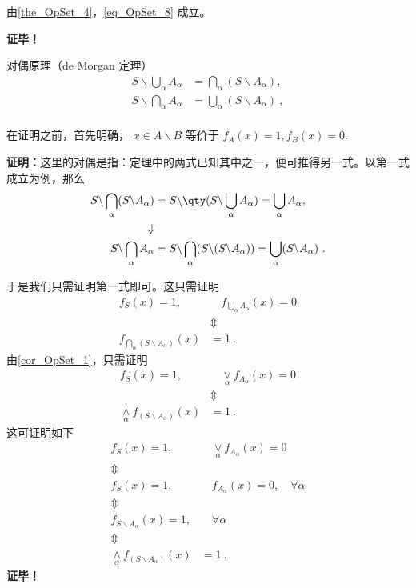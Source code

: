 由\autoref{the_OpSet_4}，\autoref{eq_OpSet_8} 成立。

\textbf{证毕！}
\begin{theorem}{对偶原理（de Morgan 定理）}
\begin{equation}
\begin{aligned}
S\backslash \bigcup_\alpha A_\alpha&=\bigcap_\alpha(S\backslash A_\alpha),\\
S\backslash \bigcap_\alpha A_\alpha&=\bigcup_\alpha(S \backslash A_\alpha)~,\\
\end{aligned}
\end{equation}
\end{theorem}

在证明之前，首先明确， $x \in A\backslash B$ 等价于 $f_A(x)=1,f_B(x)=0$.

\textbf{证明：}这里的对偶是指：定理中的两式已知其中之一，便可推得另一式。以第一式成立为例，那么
\begin{equation}
\begin{aligned}
S\backslash \bigcap_\alpha (S\backslash A_\alpha)&=S\backslash \qty(S\backslash\bigcup_\alpha A_\alpha)=\bigcup_\alpha A_\alpha,\\
\Downarrow\\
S\backslash \bigcap_\alpha A_\alpha&=S\backslash \bigcap_\alpha (S\backslash (S\backslash A_\alpha))=\bigcup_\alpha (S\backslash A_\alpha)~.
\end{aligned}
\end{equation}

于是我们只需证明第一式即可。这只需证明
\begin{equation}
\begin{aligned}
f_S(x)=1,&\quad f_{\bigcup_\alpha A_\alpha}(x)=0\\
&\Updownarrow\\
f_{\bigcap_\alpha (S\backslash A_\alpha)}(x)&=1~.
\end{aligned}
\end{equation}
由\autoref{cor_OpSet_1}，只需证明
\begin{equation}
\begin{aligned}
f_S(x)=1,&\quad \underset{\alpha}{\lor}f_{A_\alpha}(x)=0\\
&\Updownarrow\\
\underset{\alpha}{\land}f_{(S\backslash A_\alpha)}(x)&=1~.
\end{aligned}
\end{equation}
这可证明如下
\begin{equation}
\begin{aligned}
f_S(x)=1,&\quad \underset{\alpha}{\lor}f_{A_\alpha}(x)=0\\
\Updownarrow\\
f_S(x)=1,&\quad f_{A_\alpha}(x)=0,\quad\forall \alpha\\
\Updownarrow\\
f_{S\backslash A_\alpha}(x)=1,&\quad\forall \alpha\\
\Updownarrow\\
\underset{\alpha}{\land}f_{(S\backslash A_\alpha)}(x)&=1~.
\end{aligned}
\end{equation}
\textbf{证毕！}

